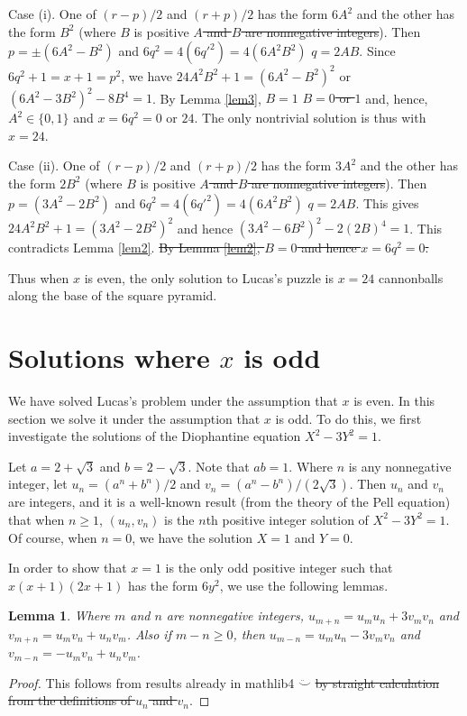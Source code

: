 \documentclass{article}
\newtheorem{lemma}{Lemma}
\numberwithin{lemma}{section}
\newcommand{\changed}[1]{{\color{teal} #1}}
\begin{document}
Case (i). One of $(r-p)/2$ and $(r+p)/2$ has the form $6A^2$ and the other has
the form $B^2$ (where \changed{$B$ is positive} \sout{$A$ and $B$ are nonnegative integers}). Then $p = \pm(6A^2-B^2)$
and \changed{$6q^2 = 4(6q'^2) = 4(6A^2B^2)$} \sout{$q = 2AB$}. Since $6q^2+1 = x+1 = p^2$, we have $24A^2B^2 + 1 = (6A^2-B^2)^2$ or
$(6A^2-3B^2)^2-8B^4 = 1$. By Lemma \ref{lem3}, \changed{$B = 1$} \sout{$B = 0$ or $1$} and, hence, \changed{$A^2 \in \{0, 1\}$ and} $x = 6q^2 = 0$ or $24$.
The only nontrivial solution is thus with $x = 24$.

Case (ii). One of $(r-p)/2$ and $(r+p)/2$ has the form $3A^2$ and the other has
the form $2B^2$ (where \changed{$B$ is positive} \sout{$A$ and $B$ are nonnegative integers}). Then $p = (3A^2-2B^2)$
and \changed{$6q^2 = 4(6q'^2) = 4(6A^2B^2)$} \sout{$q = 2AB$}. This gives $24A^2B^2+1 = (3A^2-2B^2)^2$ and hence
$(3A^2-6B^2)^2-2(2B)^4 = 1$. \changed{This contradicts Lemma \ref{lem2}.} \sout{By Lemma \ref{lem2}, $B = 0$ and hence $x = 6q^2 = 0$.}

Thus when $x$ is even, the only solution to Lucas's puzzle is $x = 24$ cannonballs
along the base of the square pyramid.

\section{Solutions where $x$ is odd}

We have solved Lucas's problem under the assumption that $x$ is even. In this
section we solve it under the assumption that $x$ is odd. To do this, we first
investigate the solutions of the Diophantine equation $X^2-3Y^2 = 1$.

Let $a = 2+\sqrt 3$ and $b = 2-\sqrt 3$. Note that $ab = 1$. Where $n$ is any nonnegative
integer, let $u_n = (a^n+b^n)/2$ and $v_n = (a^n-b^n)/(2\sqrt 3)$. Then $u_n$ and $v_n$ are
integers, and it is a well-known result (from the theory of the Pell equation) that
when $n \ge 1$, $(u_n, v_n)$ is the $n$th positive integer solution of $X^2-3Y^2 = 1$.
Of course, when $n = 0$, we have the solution $X = 1$ and $Y = 0$.

In order to show that $x = 1$ is the only odd positive integer such that
$x(x+1)(2x+1)$ has the form $6y^2$, we use the following lemmas.

\begin{lemma}\label{lem4}
Where $m$ and $n$ are nonnegative integers, $u_{m+n} = u_m u_n + 3v_m v_n$ and
$v_{m+n} = u_m v_n + u_n v_m$. Also if $m-n \ge 0$, then $u_{m-n} = u_m u_n - 3v_m v_n$ and $v_{m-n} = -u_m v_n + u_n v_m$.
\end{lemma}
\begin{proof}
This follows \changed{from results already in mathlib4 $\ddot\smile$} \sout{by straight calculation from the definitions of $u_n$ and $v_n$}.
\end{proof}
\end{document}
